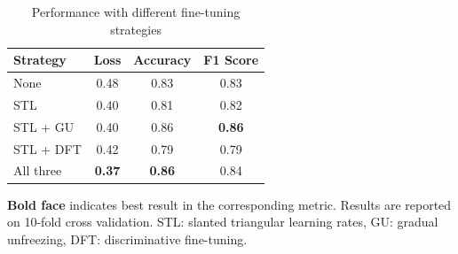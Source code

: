 \documentclass[../main.tex]{subfiles}
\begin{document}
\begin{table}
\begin{threeparttable}
  \caption{Performance with different fine-tuning strategies}
  \label{tab:catastrophic forgetting}
  \begin{tabular}{lccc}
    \toprule
    Strategy  &  Loss &  Accuracy &  F1 Score\\
    \midrule
    None  &      0.48 & 0.83 & 0.83 \\
    STL   &       0.40 & 0.81 & 0.82 \\
    STL + GU &  0.40 & 0.86 & \textbf{0.86} \\
    STL + DFT & 0.42 & 0.79 & 0.79 \\
    All three & \textbf{0.37} & \textbf{0.86} & 0.84 \\
  \bottomrule
\end{tabular}


    \begin{tablenotes}
        \small
        \item \textbf{Bold face} indicates best result in the corresponding metric. Results are reported on 10-fold cross validation. STL: slanted triangular learning rates, GU: gradual unfreezing, DFT: discriminative fine-tuning.
    \end{tablenotes}
\end{threeparttable}
\end{table}
\end{document}
